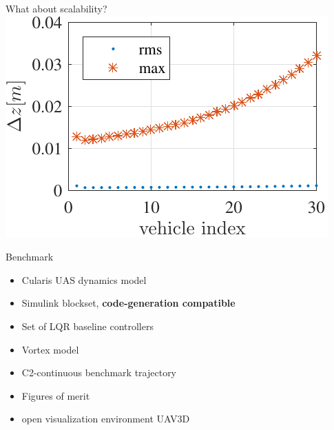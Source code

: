 \documentclass[12pt,svgnames,table,draft=false]{beamer}
\begin{document}
\begin{frame}{What about scalability?}
\centering
\includegraphics[width=\columnwidth]{erroramplification-DSMC-100Hz-TIMESCALESEPARATION-turbulence=1-turbulenceonlyfirstUAS} 
\end{frame}

\usebackgroundtemplate{}
\begin{frame}
\centering
\Large
\vspace{3em}
Benchmark
\end{frame}

\begin{frame}{}
\begin{itemize}
\item Cularis UAS dynamics model
\item Simulink blockset, \textbf{code-generation compatible}
\item Set of LQR baseline controllers
\item Vortex model \cite{dogan2005modeling}
\item C2-continuous benchmark trajectory \cite{Yang2008}
\item Figures of merit
\item open visualization environment UAV3D \cite{UAV3D}
\end{itemize}
\end{frame}
\end{document}
